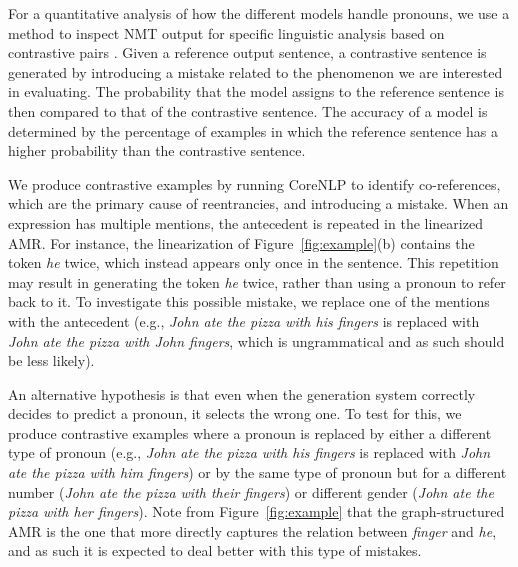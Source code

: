 \documentclass[11pt,a4paper]{article}
\begin{document}
For a quantitative analysis of how the different models handle pronouns, we use a method to inspect NMT output for specific linguistic analysis based on contrastive pairs \cite{sennrich2017grammatical}. Given a reference output sentence, a contrastive sentence is generated by introducing a mistake related to the phenomenon we are interested in evaluating. The probability that the model assigns to the reference sentence is then compared to that of the contrastive sentence. The accuracy of a model is determined by the percentage of examples in which the reference sentence has a higher probability than the contrastive sentence. 

We produce contrastive examples by running CoreNLP \cite{corenlp} to identify co-references, which are the primary cause of reentrancies, and introducing a mistake. 
When an expression has multiple mentions, the antecedent is repeated in the linearized AMR. For instance, the linearization of Figure~\ref{fig:example}(b) contains the token \emph{he} twice, which instead appears only once in the sentence. This repetition may result in generating the token \emph{he} twice, rather than using a pronoun to refer back to it. To investigate this possible mistake, we replace one of the mentions with the antecedent (e.g., \emph{John ate the pizza with his fingers} is replaced with \emph{John ate the pizza with John fingers}, which is ungrammatical and as such should be less likely). 

An alternative hypothesis is that even when the generation system correctly decides to predict a pronoun, it selects the wrong one. To test for this, we produce contrastive examples where a pronoun is replaced by either a different type of pronoun (e.g., \emph{John ate the pizza with his fingers} is replaced with \emph{John ate the pizza with him fingers}) or by the same type of pronoun but for a different number (\emph{John ate the pizza with their fingers}) or different gender (\emph{John ate the pizza with her fingers}). Note from Figure~\ref{fig:example} that the graph-structured AMR is the one that more directly captures the relation between \emph{finger} and \emph{he}, and as such it is expected to deal better with this type of mistakes.
\end{document}
